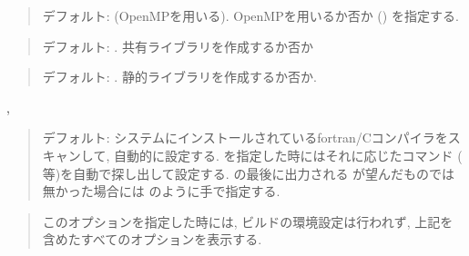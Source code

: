 \documentclass[letterpaper,10pt,dvipdfmx,openany]{sphinxmanual}
\begin{document}
\sphinxAtStartPar
{}
\begin{quote}

\sphinxAtStartPar
デフォルト:  (OpenMPを用いる).
OpenMPを用いるか否か () を指定する.
\end{quote}

\sphinxAtStartPar
{}
\begin{quote}

\sphinxAtStartPar
デフォルト: .
共有ライブラリを作成するか否か
\end{quote}

\sphinxAtStartPar
{}
\begin{quote}

\sphinxAtStartPar
デフォルト: .
静的ライブラリを作成するか否か.
\end{quote}

\sphinxAtStartPar
{}, 
\begin{quote}

\sphinxAtStartPar
デフォルト: システムにインストールされているfortran/Cコンパイラをスキャンして,
自動的に設定する.  を指定した時にはそれに応じたコマンド
( 等)を自動で探し出して設定する.
 の最後に出力される  が望んだものでは無かった場合には
 のように手で指定する.
\end{quote}

\sphinxAtStartPar
{}
\begin{quote}

\sphinxAtStartPar
このオプションを指定した時には, ビルドの環境設定は行われず,
上記を含めたすべてのオプションを表示する.
\end{quote}

\sphinxstepscope
\end{document}
